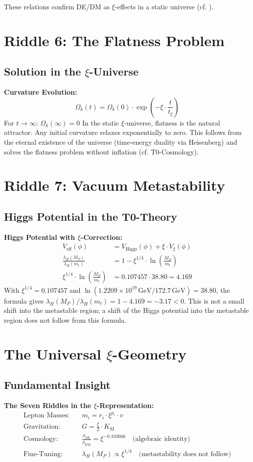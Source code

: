 	These relations confirm DE/DM as $\xi$-effects in a static universe (cf. \cite{t0_kosmologie}).
	\section{Riddle 6: The Flatness Problem}
	\subsection{Solution in the $\xi$-Universe}
	\textbf{Curvature Evolution:}
	\begin{equation}
		\Omega_k(t) = \Omega_k(0) \cdot \exp\left(-\xi \cdot \frac{t}{t_\xi}\right)
	\end{equation}
	For $t \to \infty$: $\Omega_k(\infty) = 0$
	In the static $\xi$-universe, flatness is the natural attractor. Any initial curvature relaxes exponentially to zero. This follows from the eternal existence of the universe (time-energy duality via Heisenberg) and solves the flatness problem without inflation (cf. T0-Cosmology).
	\section{Riddle 7: Vacuum Metastability}
	\subsection{Higgs Potential in the T0-Theory}
	\textbf{Higgs Potential with $\xi$-Correction:}
	\begin{align}
		V_{\text{eff}}(\phi) &= V_{\text{Higgs}}(\phi) + \xi \cdot V_\xi(\phi) \\
		\frac{\lambda_H(M_P)}{\lambda_H(m_t)} &= 1 - \xi^{1/4} \cdot \ln\left(\frac{M_P}{m_t}\right) \\
		\xi^{1/4} \cdot \ln\left(\frac{M_P}{m_t}\right) &= 0.107457 \cdot 38.80 = 4.169
	\end{align}
	With $\xi^{1/4} = 0.107457$ and $\ln(1.2209\times10^{19}\,\mathrm{GeV}/172.7\,\mathrm{GeV}) = 38.80$, the formula gives $\lambda_H(M_P)/\lambda_H(m_t) = 1 - 4.169 = -3.17 < 0$. This is not a small shift into the metastable region; a shift of the Higgs potential into the metastable region does not follow from this formula.
	\section{The Universal $\xi$-Geometry}
	\subsection{Fundamental Insight}
	\textbf{The Seven Riddles in the $\xi$-Representation:}
	\begin{align}
		\text{Lepton Masses:} &\quad m_i = r_i \cdot \xi^{p_i} \cdot v \\
		\text{Gravitation:} &\quad G = \frac{\xi}{2} \cdot K_{\text{SI}} \\
		\text{Cosmology:} &\quad \frac{\rho_{\text{DE}}}{\rho_{\text{DM}}} = \xi^{-0.102666} \quad \text{(algebraic identity)} \\
		\text{Fine-Tuning:} &\quad \lambda_H(M_P) \propto \xi^{1/4} \quad \text{(metastability does not follow)}
	\end{align}
